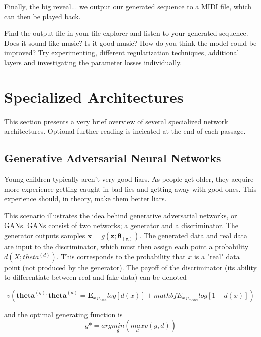\documentclass{article}
\begin{document}


Finally, the big reveal... we output our generated sequence to a MIDI file, which can then be played back.



Find the output file in your file explorer and listen to your generated sequence. Does it sound like music? Is it good music? How do you think the model could be improved? Try experimenting, different regularization techniques, additional layers and investigating the parameter losses individually.

\section{Specialized Architectures}

This section presents a very brief overview of several specialized network architectures. Optional further reading is incicated at the end of each passage.

\subsection{Generative Adversarial Neural Networks} %

Young children typically aren't very good liars. As people get older, they acquire more experience getting caught in bad lies and getting away with good ones. This experience should, in theory, make them better liars.

This scenario illustrates the idea behind generative adversarial networks, or GANs. GANs consist of two networks; a generator and a discriminator. The generator outputs samples \(\bm{x} = g(\bm{z; \theta_{(g)}})\). The generated data and real data are input to the discriminator, which must then assign each point a probability \(d(X; theta^{(d)})\). This corresponds to the probability that \(x\) is a "real" data point (not produced by the generator). The payoff of the discriminator \cite{Goodfellow-et-al-2016} (its ability to differentiate between real and fake data) can be denoted 

\[v(\bm{theta}^{(g),}\bm{theta}^{(d)} = \mathbf{E}_{x~p_{\text{data}}}log[d(x)] + mathbf{E}_{x~p_{\text{model}}}log[1-d(x)])\]

and the optimal generating function \cite{Goodfellow-et-al-2016} is
\[g* = arg\underset{g}{min}(\underset{d}{max}v(g,d))\]
\end{document}
